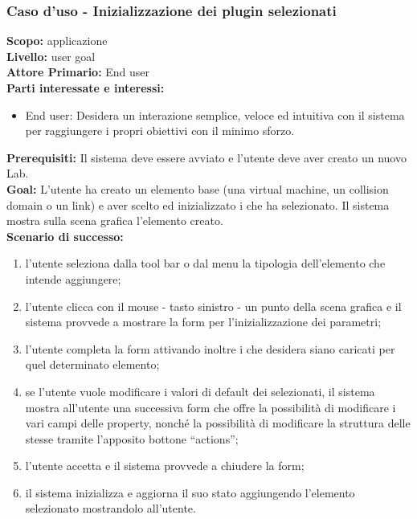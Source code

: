 \begin{flushleft}
\begin{boxedminipage}{\textwidth}

\subsubsection*{Caso d'uso - Inizializzazione dei plugin selezionati}

\textbf{Scopo:} applicazione \visualnetkit{} \\
\textbf{Livello:} user goal \\
\textbf{Attore Primario:} End user \\
\textbf{Parti interessate e interessi:}
\begin{itemize}
\item End user: Desidera un interazione semplice, veloce ed intuitiva con il sistema per raggiungere i propri obiettivi con il minimo sforzo.
\end{itemize}

\textbf{Prerequisiti:} Il sistema deve essere avviato e l'utente deve aver creato un nuovo Lab. \\
\textbf{Goal:} L'utente ha creato un elemento base (una virtual machine, un collision domain o un link) e aver scelto ed inizializzato i \plugin{} che ha selezionato. Il sistema mostra sulla scena grafica l'elemento creato. \\

\textbf{Scenario di successo:}
\begin{enumerate}
\item l'utente seleziona dalla tool bar o dal menu la tipologia dell'elemento che intende aggiungere;
\item l'utente clicca con il mouse - tasto sinistro - un punto della scena grafica e il sistema provvede a mostrare la form per l'inizializzazione dei parametri;
\item l'utente completa la form attivando inoltre i \plugin{} che desidera siano caricati per quel determinato elemento;
\item se l'utente vuole modificare i valori di default dei \plugin{} selezionati, il sistema mostra all'utente una successiva form che offre la possibilità di modificare i vari campi delle property, nonché la possibilità di modificare la struttura delle stesse tramite l'apposito bottone ``actions'';
\item l'utente accetta e il sistema provvede a chiudere la form;
\item il sistema inizializza e aggiorna il suo stato aggiungendo l'elemento selezionato mostrandolo all'utente.
\end{enumerate}

\end{boxedminipage}
\end{flushleft}

